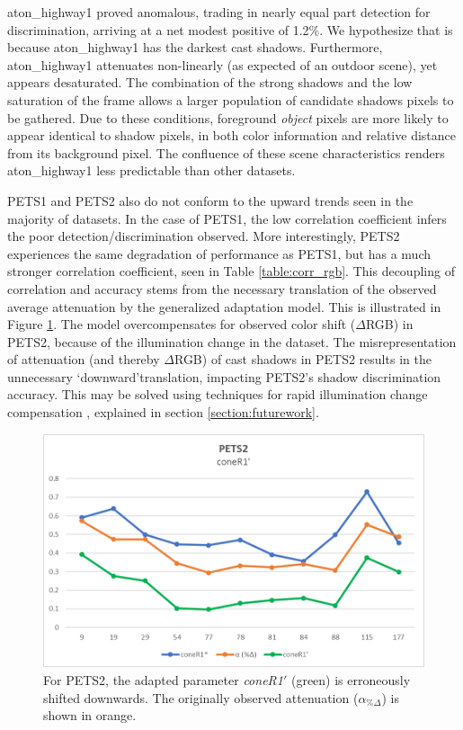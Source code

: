 aton\_highway1 proved anomalous, trading in nearly equal part detection for discrimination, arriving at a net modest positive of 1.2\%. We hypothesize that is because aton\_highway1 has the darkest cast shadows. Furthermore, aton\_highway1 attenuates non-linearly (as expected of an outdoor scene), yet appears desaturated. The combination of the strong shadows and the low saturation of the frame allows a larger population of candidate shadows pixels to be gathered. Due to these conditions, foreground \textit{object} pixels are more likely to appear identical to shadow pixels, in both color information and relative distance from its background pixel. The confluence of these scene characteristics renders aton\_highway1 less predictable than other datasets.

PETS1 and PETS2 also do not conform to the upward trends seen in the majority of datasets. In the case of PETS1, the low correlation coefficient infers the poor detection/discrimination observed. More interestingly, PETS2 experiences the same degradation of performance as PETS1, but has a much stronger correlation coefficient, seen in Table \ref{table:corr_rgb}. This decoupling of correlation and accuracy stems from the necessary translation of the observed average attenuation by the generalized adaptation model. This is illustrated in Figure \ref{fig:pets2_translate}. The model overcompensates for observed color shift ($\Delta$RGB) in PETS2, because of the illumination change in the dataset. The misrepresentation of attenuation (and thereby $\Delta$RGB) of cast shadows in PETS2 results in the unnecessary \lq{downward}\rq translation, impacting PETS2's shadow discrimination accuracy. This may be solved using techniques for rapid illumination change compensation \cite{bales2011bigbackground}, explained in section \ref{section:futurework}.

\begin{figure}
  \centering
  \includegraphics[width=.8\linewidth]{figures/model/pets2_translate.jpg}
\caption{For PETS2, the adapted parameter \textit{coneR1}$'$ (green) is erroneously shifted downwards. The originally observed attenuation ($\alpha_{\%\Delta}$) is shown in orange.}
\label{fig:pets2_translate}
\end{figure} 

